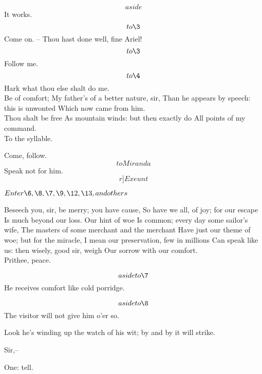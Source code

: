 \documentclass[11pt]{book}
\begin{document}
\1	\[aside\]  It works.   \[to \3\]    Come on. --
	Thou hast done well, fine Ariel!\[to \3\]  Follow me.
	\[to \4\]
	Hark what thou else shalt do me. \\

\2	Be of comfort;
	My father's of a better nature, sir,
	Than he appears by speech: this is unwonted
	Which now came from him. \\

\1	Thou shalt be free
	As mountain winds: but then exactly do
	All points of my command. \\

\4	To the syllable.

\1	Come, follow. \[to Miranda\] Speak not for him. \[r]Exeunt\]

\Act  
{}


\(Enter \6, \8, \7, \9, \12, \13, and others\)

\9	Beseech you, sir, be merry; you have cause,
	So have we all, of joy; for our escape
	Is much beyond our loss. Our hint of woe
	Is common; every day some sailor's wife,
	The masters of some merchant and the merchant
	Have just our theme of woe; but for the miracle,
	I mean our preservation, few in millions
	Can speak like us: then wisely, good sir, weigh
	Our sorrow with our comfort. \\

\6	Prithee, peace.

\begin{PROSE}

\8\[aside to \7\]He receives comfort like cold porridge.

\7  \[aside to \8\] The visitor will not give him o'er so.

\8	Look he's winding up the watch of his wit;
	by and by it will strike.

\9	Sir,--

\8	One: tell.
\end{PROSE}
\end{document}
